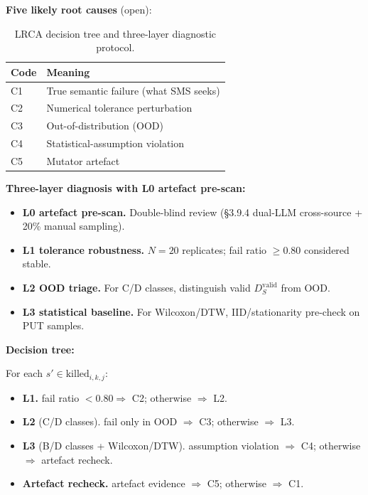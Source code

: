 \documentclass[review,12pt,authoryear]{elsarticle}
\begin{document}
\textbf{Five likely root causes} (open):

{\def\LTcaptype{table} %
\begin{longtable}[]{@{}ll@{}}
\caption{LRCA decision tree and three-layer diagnostic protocol.}\label{tab:p2-15}\\
\toprule\noalign{}
Code & Meaning \\
\midrule\noalign{}
\endfirsthead
\endhead
\bottomrule\noalign{}
\endlastfoot
C1 & True semantic failure (what SMS seeks) \\
C2 & Numerical tolerance perturbation \\
C3 & Out-of-distribution (OOD) \\
C4 & Statistical-assumption violation \\
C5 & Mutator artefact \\
\end{longtable}
}

\textbf{Three-layer diagnosis with L0 artefact pre-scan:}

\begin{itemize}
\item \textbf{L0 artefact pre-scan.} Double-blind review (§3.9.4 dual-LLM cross-source + 20\% manual sampling).
\item \textbf{L1 tolerance robustness.} $N = 20$ replicates; fail ratio $\geq 0.80$ considered stable.
\item \textbf{L2 OOD triage.} For C/D classes, distinguish valid $D_S^{\text{valid}}$ from OOD.
\item \textbf{L3 statistical baseline.} For Wilcoxon/DTW, IID/stationarity pre-check on PUT samples.
\end{itemize}

\textbf{Decision tree:}

For each $s' \in \mathrm{killed}_{i,k,j}$:
\begin{itemize}
\item \textbf{L1.} fail ratio $< 0.80 \Rightarrow$ C2; otherwise $\Rightarrow$ L2.
\item \textbf{L2} (C/D classes). fail only in OOD $\Rightarrow$ C3; otherwise $\Rightarrow$ L3.
\item \textbf{L3} (B/D classes + Wilcoxon/DTW). assumption violation $\Rightarrow$ C4; otherwise $\Rightarrow$ artefact recheck.
\item \textbf{Artefact recheck.} artefact evidence $\Rightarrow$ C5; otherwise $\Rightarrow$ C1.
\end{itemize}
\end{document}

